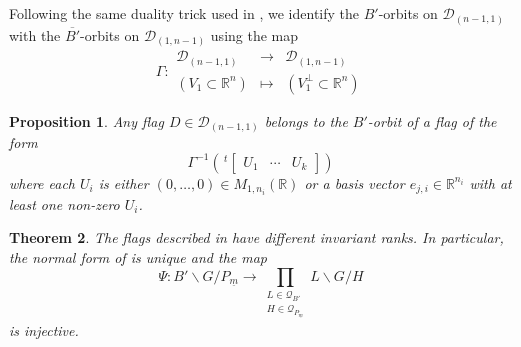 \documentclass[pdftex]{sigma}
\numberwithin{equation}{section}
\newtheorem{Theorem}{Theorem}[section]
\newtheorem{Proposition}[Theorem]{Proposition}
\theoremstyle{definition}
\newcommand{\R}{\mathbb{R}}
\newcommand{\D}{\mathcal{D}}
\theoremstyle{plain}
\theoremstyle{plain}
\theoremstyle{plain}
\theoremstyle{plain}
\begin{document}
Following the same duality trick used in , we identify the $B'$-orbits on $\D_{(n-1,1)}$ with the $\overline{B'}$-orbits on $\D_{(1,n-1)}$ using the map
\begin{equation*}
	\Gamma : \begin{array}{ccc}
		\D_{(n-1,1)} & \to & \D_{(1,n-1)} \\
		(V_1 \subset \R^n) & \mapsto & (V_1^\perp \subset \R^n)
	\end{array}
\end{equation*}

\begin{Proposition}{\label{orbits III2}}
	Any flag $D \in \D_{(n-1,1)}$ belongs to the $B'$-orbit of a flag of the form
	\begin{equation*}
		\Gamma^{-1}\left(\,^t\begin{bmatrix}
		U_1 & \cdots & U_k
	\end{bmatrix}\right)
	\end{equation*}
	where each $U_i$ is either $(0,\dots,0) \in M_{1,n_i}(\R)$ or a basis vector $e_{j,i} \in \R^{n_i}$ with at least one non-zero $U_i$.
\end{Proposition}

\begin{Theorem}
	The flags described in  have different invariant ranks. In particular, the normal form of  is unique and the map
	\begin{equation*}
		\Psi : B'\backslash G/P_{\underline m} \to \displaystyle \prod_{\substack{L \in \mathcal Q_{B'} \\ H \in \mathcal Q_{P_{\underline m}}}} L\backslash G/H
	\end{equation*}
	is injective.
\end{Theorem}
\end{document}
